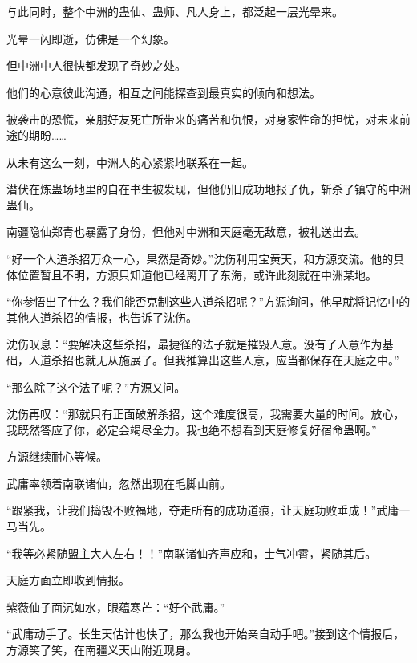 \begin{this_body}
与此同时，整个中洲的蛊仙、蛊师、凡人身上，都泛起一层光晕来。

光晕一闪即逝，仿佛是一个幻象。

但中洲中人很快都发现了奇妙之处。

他们的心意彼此沟通，相互之间能探查到最真实的倾向和想法。

被袭击的恐慌，亲朋好友死亡所带来的痛苦和仇恨，对身家性命的担忧，对未来前途的期盼……

从未有这么一刻，中洲人的心紧紧地联系在一起。

潜伏在炼蛊场地里的自在书生被发现，但他仍旧成功地报了仇，斩杀了镇守的中洲蛊仙。

南疆隐仙郑青也暴露了身份，但他对中洲和天庭毫无敌意，被礼送出去。

“好一个人道杀招万众一心，果然是奇妙。”沈伤利用宝黄天，和方源交流。他的具体位置暂且不明，方源只知道他已经离开了东海，或许此刻就在中洲某地。

“你参悟出了什么？我们能否克制这些人道杀招呢？”方源询问，他早就将记忆中的其他人道杀招的情报，也告诉了沈伤。

沈伤叹息：“要解决这些杀招，最捷径的法子就是摧毁人意。没有了人意作为基础，人道杀招也就无从施展了。但我推算出这些人意，应当都保存在天庭之中。”

“那么除了这个法子呢？”方源又问。

沈伤再叹：“那就只有正面破解杀招，这个难度很高，我需要大量的时间。放心，我既然答应了你，必定会竭尽全力。我也绝不想看到天庭修复好宿命蛊啊。”

方源继续耐心等候。

武庸率领着南联诸仙，忽然出现在毛脚山前。

“跟紧我，让我们捣毁不败福地，夺走所有的成功道痕，让天庭功败垂成！”武庸一马当先。

“我等必紧随盟主大人左右！！”南联诸仙齐声应和，士气冲霄，紧随其后。

天庭方面立即收到情报。

紫薇仙子面沉如水，眼蕴寒芒：“好个武庸。”

“武庸动手了。长生天估计也快了，那么我也开始亲自动手吧。”接到这个情报后，方源笑了笑，在南疆义天山附近现身。

\end{this_body}

